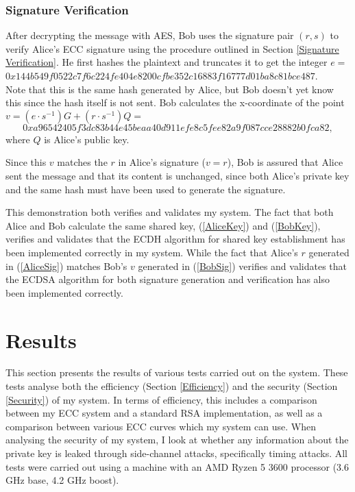 \documentclass[12pt,a4paper]{article}
\begin{document}
\subsubsection{Signature Verification} \noindent \label{Example4}
After decrypting the message with AES, Bob uses the signature pair $(r,s)$ to verify Alice's ECC signature 
using the procedure outlined in Section \ref{Signature Verification}. 
He first hashes the plaintext and truncates it to get the integer $e =$ \\
{\footnotesize$0x144b549f0522c7f6c224fe404e8200cfbe352c16883f16777d01ba8c81bce487$}. \\
Note that this is the same hash generated by Alice, but Bob doesn't yet know this since the hash itself is not sent. 
Bob calculates the x-coordinate of the point $v = (e \cdot s^{-1})G + (r \cdot s^{-1})Q =$ \\
\begin{equation} \label{BobSig}
    0xa96542405f3dc83b44e45beaa40d911efe8c5fee82a9f087cce28882b0fca82,
\end{equation}
where $Q$ is Alice's public key. 

Since this $v$ matches the $r$ in Alice's signature ($v=r$), 
Bob is assured that Alice sent the message and that its content is unchanged, 
since both Alice's private key and the same hash must have been used to generate the signature. 

\vspace{5mm}

This demonstration both verifies and validates my system. 
The fact that both Alice and Bob calculate the same shared key, (\ref{AliceKey}) and (\ref{BobKey}), 
verifies and validates that the ECDH algorithm for shared key establishment has been implemented correctly in my system. 
While the fact that Alice's $r$ generated in (\ref{AliceSig}) matches Bob's $v$ generated in (\ref{BobSig}) 
verifies and validates that the ECDSA algorithm for both signature generation and verification has also been implemented correctly. 


\section{Results} \noindent \label{Results}
This section presents the results of various tests carried out on the system. 
These tests analyse both the efficiency (Section \ref{Efficiency}) and the security (Section \ref{Security}) of my system. 
In terms of efficiency, this includes a comparison between my ECC system and a standard RSA implementation, 
as well as a comparison between various ECC curves which my system can use. 
When analysing the security of my system, I look at whether any information about the private key is leaked through side-channel attacks, 
specifically timing attacks. 
All tests were carried out using a machine with an AMD Ryzen 5 3600 processor (3.6 GHz base, 4.2 GHz boost). 
\end{document}
